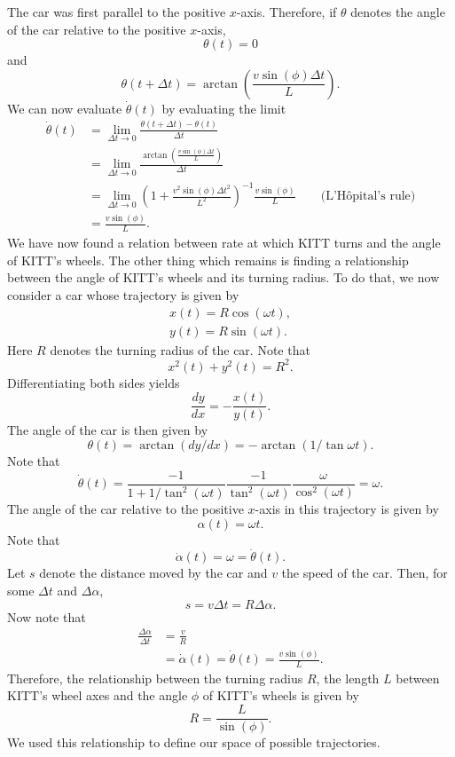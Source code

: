 \documentclass[11pt,titlepage]{report}
\begin{document}
The car was first parallel to the positive $x$-axis. Therefore, if $\theta$ denotes the angle of the car relative to the positive $x$-axis,
\[
	\theta(t) = 0
\]
and
\[
	\theta(t+\Delta t)=\arctan{\left(\frac{v \sin{(\phi)}\Delta t}{L}\right)}.
\]
We can now evaluate $\dot{\theta}(t)$ by evaluating the limit
\begin{align}
	\dot{\theta}(t) &= \lim_{\Delta t \rightarrow 0} \frac{\theta(t+\Delta t)-\theta(t)}{\Delta t} \nonumber \\
	&= \lim_{\Delta t \rightarrow 0} \frac{\arctan{\left(\frac{v \sin{(\phi)}\Delta t}{L}\right)}}{\Delta t} \nonumber \\
	&= \lim_{\Delta t \rightarrow 0} \left(1+\frac{v^2 \sin{(\phi)}\Delta t^2}{L^2}\right)^{-1}\frac{v \sin{(\phi)}}{L} \quad \quad \text{(L'H\^opital's rule)} \nonumber \\
	&= \frac{v \sin{(\phi)}}{L}. \label{eq:steering-derivative}
\end{align}
We have now found a relation between rate at which KITT turns and the angle of KITT's wheels. The other thing which remains is finding a relationship between the angle of KITT's wheels and its turning radius. To do that, we now consider a car whose trajectory is given by
\begin{align*}
	x(t) = R \cos{(\omega t)}, \\
	y(t) = R \sin{(\omega t)}.
\end{align*}
Here $R$ denotes the turning radius of the car. Note that
\[
	x^2(t)+y^2(t)=R^2.
\]
Differentiating both sides yields
\[
	\frac{dy}{dx}=-\frac{x(t)}{y(t)}.
\]
The angle of the car is then given by
\[
	\theta(t) = \arctan{(dy/dx)} = -\arctan{(1/\tan{\omega t})}.
\]
Note that
\[
	\dot{\theta}(t) = \frac{-1}{1+1/\tan^2{(\omega t)}} \frac{-1}{\tan^2{(\omega t)}} \frac{\omega}{\cos^2{(\omega t)}} = \omega.
\]
The angle of the car relative to the positive $x$-axis in this trajectory is given by
\[
	\alpha(t) = \omega t.
\]
Note that
\[
	\dot{\alpha}(t) = \omega = \dot{\theta}(t).
\]
Let $s$ denote the distance moved by the car and $v$ the speed of the car. Then, for some $\Delta t$ and $\Delta \alpha$,
\[
	s = v \Delta t = R \Delta \alpha.
\]
Now note that
\begin{align*}
	\frac{\Delta \alpha}{\Delta t} &= \frac{v}{R} \\
	&=\dot{\alpha}(t)=\dot{\theta}(t) = \frac{v \sin{(\phi)}}{L}.
\end{align*}
Therefore, the relationship between the turning radius $R$, the length $L$ between KITT's wheel axes and the angle $\phi$ of KITT's wheels is given by
\begin{equation} \label{eq:steering-radius}
	R = \frac{L}{\sin{(\phi)}}.
\end{equation}
We used this relationship to define our space of possible trajectories.
\end{document}

